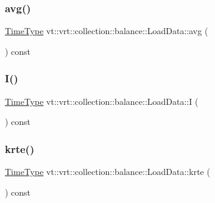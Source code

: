 \subsubsection{\texorpdfstring{avg()}{avg()}}
{\footnotesize\ttfamily \hyperlink{namespacevt_a876a9d0cd5a952859c72de8a46881442}{Time\+Type} vt\+::vrt\+::collection\+::balance\+::\+Load\+Data\+::avg (\begin{DoxyParamCaption}{ }\end{DoxyParamCaption}) const\hspace{0.3cm}{\ttfamily [inline]}}

\mbox{\label{structvt_1_1vrt_1_1collection_1_1balance_1_1_load_data_aa5715f66445228e6d7961987443b0e68}} 
\subsubsection{\texorpdfstring{I()}{I()}}
{\footnotesize\ttfamily \hyperlink{namespacevt_a876a9d0cd5a952859c72de8a46881442}{Time\+Type} vt\+::vrt\+::collection\+::balance\+::\+Load\+Data\+::I (\begin{DoxyParamCaption}{ }\end{DoxyParamCaption}) const\hspace{0.3cm}{\ttfamily [inline]}}

\mbox{\label{structvt_1_1vrt_1_1collection_1_1balance_1_1_load_data_a01ab8ead157e42fa39ac1ab19ab109c0}} 
\subsubsection{\texorpdfstring{krte()}{krte()}}
{\footnotesize\ttfamily \hyperlink{namespacevt_a876a9d0cd5a952859c72de8a46881442}{Time\+Type} vt\+::vrt\+::collection\+::balance\+::\+Load\+Data\+::krte (\begin{DoxyParamCaption}{ }\end{DoxyParamCaption}) const\hspace{0.3cm}{\ttfamily [inline]}}

